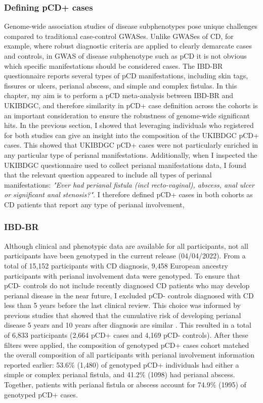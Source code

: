   \subsubsection{Defining pCD+ cases}
  Genome-wide association studies of disease subphenotypes pose unique challenges compared to traditional case-control GWASes. Unlike GWASes of CD, for example, where robust diagnostic criteria are applied to clearly demarcate cases and controls, in GWAS of disease subphenotype such as pCD it is not obvious which specific manifestations should be considered cases. The IBD-BR questionnaire reports several types of pCD manifestations, including skin tags, fissures or ulcers, perianal abscess, and simple and complex fistulas. In this chapter, my aim is to perform a pCD meta-analysis between IBD-BR and UKIBDGC, and therefore similarity in pCD+ case definition across the cohorts is an important consideration to ensure the robustness of genome-wide significant hits. In the previous section, I showed that leveraging individuals who registered for both studies can give an insight into the composition of the UKIBDGC pCD+ cases. This showed that UKIBDGC pCD+ cases were not particularly enriched in any particular type of perianal manifestations. Additionally, when I inspected the UKIBDGC questionnaire used to collect perianal manifestations data, I found that the relevant question appeared to include all types of perianal manifestations: \textit{"Ever had perianal fistula (incl recto-vaginal),  abscess, anal ulcer or significant anal stenosis?"}. I therefore defined pCD+ cases in both cohorts as CD patients that report any type of perianal involvement,
  
 
\subsubsection{IBD-BR}
Although clinical and phenotypic data are available for all participants, not all participants have been genotyped in the current release (04/04/2022). From a total of 15,152 participants with CD diagnosis, 9,458 European ancestry participants with perianal involvement data were genotyped. To ensure that pCD- controls do not include recently diagnosed CD patients who may develop perianal disease in the near future, I excluded pCD- controls diagnosed with CD less than 5 years before the last clinical review. This choice was informed by previous studies that showed that the cumulative risk of developing perianal disease 5 years and 10 years after diagnosis are similar \cite{Tsai2022-kz}. This resulted in a total of 6,833 participants (2,664 pCD+ cases and 4,169 pCD- controls). After these filters were applied, the composition of genotyped pCD+ cases cohort matched the overall composition of all participants with perianal involvement information reported earlier: 53.6\% (1,480) of genotyped pCD+ individuals had either a simple or complex perianal fistula, and 41.2\% (1098) had perianal abscess. Together, patients with perianal fistula or abscess account for 74.9\% (1995) of genotyped pCD+ cases.\\


